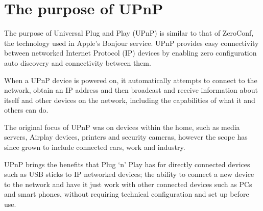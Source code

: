 \section{The purpose of UPnP}

The purpose of Universal Plug and Play (UPnP) is similar to that of ZeroConf, the technology used in Apple's Bonjour service\cite{encyclopedia-upnp}. UPnP provides easy connectivity between networked Internet Protocol (IP) devices by enabling zero configuration auto discovery and connectivity between them\cite{device-architecture}. 

When a UPnP device is powered on, it automatically attempts to connect to the network, obtain an IP address and then broadcast and receive information about itself and other devices on the network, including the capabilities of what it and others can do\cite{pcworld-upnp}.

The original focus of UPnP was on devices within the home, such as media servers, Airplay devices, printers and security cameras, however the scope has since grown to include connected cars, work and industry\cite{discovery-and-service-layer}.

UPnP brings the benefits that Plug `n' Play has for directly connected devices such as USB sticks to IP networked devices; the ability to connect a new device to the network and have it just work with other connected devices such as PCs and smart phones, without requiring technical configuration and set up before use.
